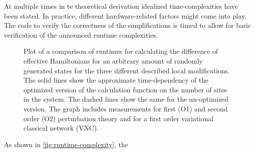 At multiple times in te theoretical derivation idealized time-complexities have been stated.
In practice, different hardware-related factors might come into play.
The code to verify the correctness of the simplifications is timed to allow for basic verification of the announced runtime complexities.

\begin{figure}[htbp]
    \centering
    \hspace{-1cm}
    \caption{
            Plot of a comparison of runtimes for calculating the difference of effective Hamiltonians for an arbitrary amount of randomly generated states for the three different described local modifications. 
            The solid lines show the approximate time-dependency of the optimized version of the calculation function on the number of sites in the system.
            The dashed lines show the same for the un-optimized version.
            The graph includes measurements for first (O1) and second order (O2) perturbation theory and for a first order variational classical network (VNC).
        }
    \label{fig:runtime-complexity}
\end{figure}

As shown in \autoref{fig:runtime-complexity}, the 
